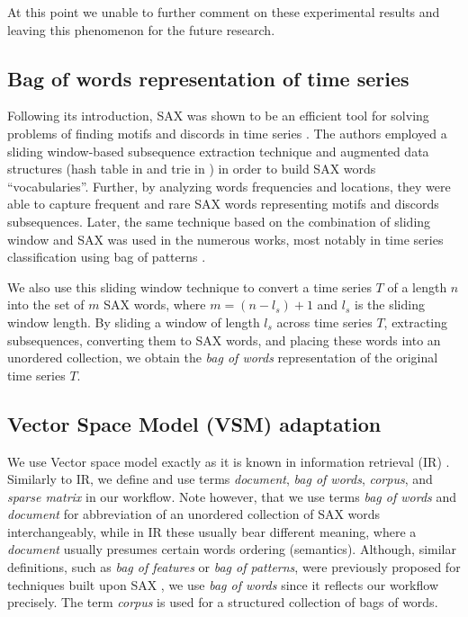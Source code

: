 At this point we unable to further comment on these experimental results and 
leaving this phenomenon for the future research.


\subsection{Bag of words representation of time series}\label{bow_representation}
Following its introduction, SAX was shown to be an efficient tool for solving problems 
of finding motifs and discords in time series \cite{citeulike:3977965, citeulike:3175749}. 
The authors employed a sliding window-based subsequence extraction technique 
and augmented data structures (hash table in \cite{citeulike:3977965} and trie in \cite{citeulike:3175749}) 
in order to build SAX words ``vocabularies''. Further, by analyzing words frequencies 
and locations, they were able to capture frequent and rare SAX words representing 
motifs and discords subsequences. Later, the same technique based on the combination 
of sliding window and SAX was used in the numerous works, most notably in time series 
classification using bag of patterns \cite{citeulike:10525778}. 

We also use this sliding window technique to convert a time series $T$ of a length $n$ into 
the set of $m$ SAX words, where $m=(n-l_{s})+1$ and $l_{s}$ is the sliding window length. 
By sliding a window of length $l_{s}$ across time series $T$, extracting subsequences, 
converting them to SAX words, and placing these words into an unordered collection, 
we obtain the \textit{bag of words} representation of the original time series $T$.

\subsection{Vector Space Model (VSM) adaptation}\label{vsm}
We use Vector space model exactly as it is known in information retrieval (IR) \cite{citeulike:300428}. 
Similarly to IR, we define and use terms \textit{document}, \textit{bag of words}, 
\textit{corpus}, and \textit{sparse matrix} in our workflow. 
Note however, that we use terms \textit{bag of words} and \textit{document} 
for abbreviation of an unordered collection of SAX words interchangeably, while 
in IR these usually bear different meaning, where a \textit{document} usually 
presumes certain words ordering (semantics). 
Although, similar definitions, such as \textit{bag of features} or 
\textit{bag of patterns}, were previously proposed for techniques built upon 
SAX \cite{citeulike:10525778}, we use \textit{bag of words} since it reflects our 
workflow precisely. The term \textit{corpus} is used for a structured collection 
of bags of words. 

